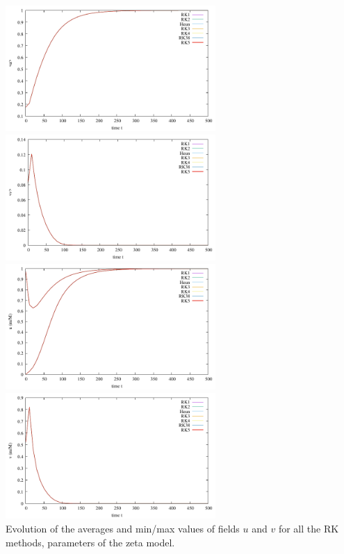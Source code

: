 \begin{center}
\includegraphics[width=8cm]{python_codes/fieldstone_171/RKtest1/avrg_u.pdf}
\includegraphics[width=8cm]{python_codes/fieldstone_171/RKtest1/avrg_v.pdf}\\
\includegraphics[width=8cm]{python_codes/fieldstone_171/RKtest1/stats_u.pdf}
\includegraphics[width=8cm]{python_codes/fieldstone_171/RKtest1/stats_v.pdf}\\
{\captionfont Evolution of the averages and min/max values of fields $u$
and $v$ for all the RK methods, parameters of the zeta model.}
\end{center}


